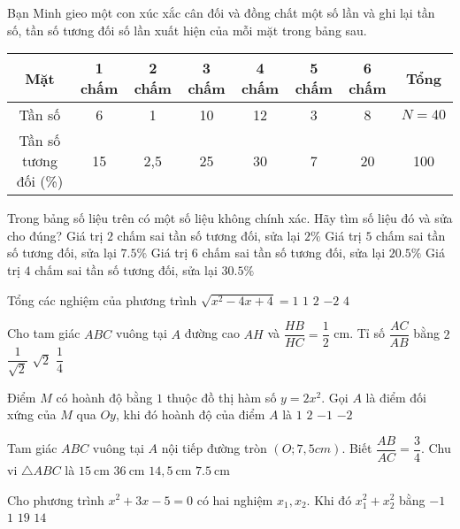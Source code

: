 \begin{ex}
[TH] Bạn Minh gieo một con xúc xắc cân đối và đồng chất một số lần và ghi lại tần số, tần số tương đối số lần xuất hiện của mỗi mặt trong bảng sau.
\begin{table}[h!]
\centering
\begin{tabular}{|c|c|c|c|c|c|c|c|}
\hline
\textbf{Mặt} & 1 chấm & 2 chấm & 3 chấm & 4 chấm & 5 chấm & 6 chấm & \textbf{Tổng} \\
\hline
Tần số & 6 & 1 & 10 & 12 & 3 & 8 & $N=40$ \\
\hline
Tần số tương đối (\%) & 15 & 2,5 & 25 & 30 & 7 & 20 & 100 \\
\hline
\end{tabular}
\end{table}
Trong bảng số liệu trên có một số liệu không chính xác. Hãy tìm số liệu đó và sửa cho đúng?
\choice
{Giá trị $2$ chấm sai tần số tương đối, sửa lại $2\%$}
{\True Giá trị $5$ chấm sai tần số tương đối, sửa lại $7.5\%$}
{Giá trị $6$ chấm sai tần số tương đối, sửa lại $20.5\%$}
{Giá trị $4$ chấm sai tần số tương đối, sửa lại $30.5\%$}
\end{ex}
\begin{ex}
Tổng các nghiệm của phương trình $\sqrt{x^2-4x+4}=1$
\choice
{$1$}
{$2$}
{$-2$}
{\True $4$}
\end{ex}
\begin{ex}
Cho tam giác $ABC$ vuông tại $A$ đường cao $AH$ và $\dfrac{HB}{HC}=\dfrac{1}{2}$ cm. Tỉ số $\dfrac{AC}{AB}$ bằng
\choice
{$2$}
{$\dfrac{1}{\sqrt{2}}$}
{\True $\sqrt{2}$}
{$\dfrac{1}{4}$}
\end{ex}
\begin{ex}
[TH] Điểm $M$ có hoành độ bằng $1$ thuộc đồ thị hàm số $y=2x^2$. Gọi $A$ là điểm đối xứng của $M$ qua $Oy$, khi đó hoành độ của điểm $A$ là
\choice
{$1$}
{$2$}
{\True $-1$}
{$-2$}
\end{ex}
\begin{ex}
[TH] Tam giác $ABC$ vuông tại $A$ nội tiếp đường tròn $(O; 7,5cm)$. Biết $\dfrac{AB}{AC}=\dfrac{3}{4}$. Chu vi $\triangle ABC$ là
\choice
{$15\mathrm{~cm}$}
{\True $36\mathrm{~cm}$}
{$14,5\mathrm{~cm}$}
{$7.5\mathrm{~cm}$}
\end{ex}
\begin{ex}
Cho phương trình $x^2+3x-5=0$ có hai nghiệm $x_1, x_2$. Khi đó $x_1^2+x_2^2$ bằng
\choice
{$-1$}
{$1$}
{\True $19$}
{$14$}
\end{ex}
\begin{ex}
[VD] 
{
\texttt{[image: C:/texstudio-man/Anh/\{7417F277-D044-44E2-B7BC-A2A33CBDE33E]}}
}
\loigiai{
Ta có $\tan 35^\circ=\dfrac{AD}{62}$\\
$\Rightarrow AD=62.\tan 35^\circ=43.4m$\\
Vậy chiều cao tòa nhà là $AB=43.4+1.6=45.0$}
\end{ex}
